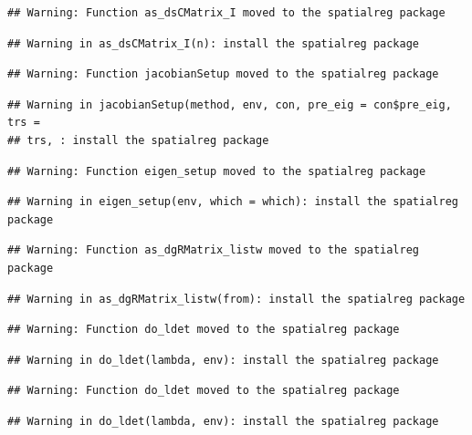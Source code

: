 \documentclass[11pt,]{article}
\begin{document}
\begin{verbatim}
## Warning: Function as_dsCMatrix_I moved to the spatialreg package
\end{verbatim}

\begin{verbatim}
## Warning in as_dsCMatrix_I(n): install the spatialreg package
\end{verbatim}

\begin{verbatim}
## Warning: Function jacobianSetup moved to the spatialreg package
\end{verbatim}

\begin{verbatim}
## Warning in jacobianSetup(method, env, con, pre_eig = con$pre_eig, trs =
## trs, : install the spatialreg package
\end{verbatim}

\begin{verbatim}
## Warning: Function eigen_setup moved to the spatialreg package
\end{verbatim}

\begin{verbatim}
## Warning in eigen_setup(env, which = which): install the spatialreg package
\end{verbatim}

\begin{verbatim}
## Warning: Function as_dgRMatrix_listw moved to the spatialreg package
\end{verbatim}

\begin{verbatim}
## Warning in as_dgRMatrix_listw(from): install the spatialreg package
\end{verbatim}

\begin{verbatim}
## Warning: Function do_ldet moved to the spatialreg package
\end{verbatim}

\begin{verbatim}
## Warning in do_ldet(lambda, env): install the spatialreg package
\end{verbatim}

\begin{verbatim}
## Warning: Function do_ldet moved to the spatialreg package
\end{verbatim}

\begin{verbatim}
## Warning in do_ldet(lambda, env): install the spatialreg package
\end{verbatim}
\end{document}
